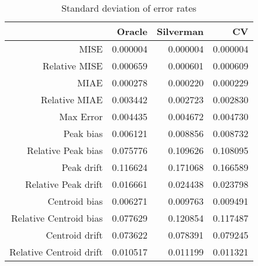 \begin{table}[ht]
\centering
\begin{tabular}{rrrr}
  \hline
 & Oracle & Silverman & CV \\ 
  \hline
MISE & 0.000004 & 0.000004 & 0.000004 \\ 
  Relative MISE & 0.000659 & 0.000601 & 0.000609 \\ 
  MIAE & 0.000278 & 0.000220 & 0.000229 \\ 
  Relative MIAE & 0.003442 & 0.002723 & 0.002830 \\ 
  Max Error & 0.004435 & 0.004672 & 0.004730 \\ 
  Peak bias & 0.006121 & 0.008856 & 0.008732 \\ 
  Relative Peak bias & 0.075776 & 0.109626 & 0.108095 \\ 
  Peak drift & 0.116624 & 0.171068 & 0.166589 \\ 
  Relative Peak drift & 0.016661 & 0.024438 & 0.023798 \\ 
  Centroid bias & 0.006271 & 0.009763 & 0.009491 \\ 
  Relative Centroid bias & 0.077629 & 0.120854 & 0.117487 \\ 
  Centroid drift & 0.073622 & 0.078391 & 0.079245 \\ 
  Relative Centroid drift & 0.010517 & 0.011199 & 0.011321 \\ 
   \hline
\end{tabular}
\caption{Standard deviation of error rates} 
\label{tbl:stddev_error_rates}
\end{table}
